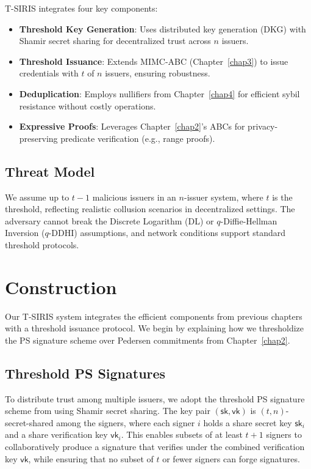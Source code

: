 T-SIRIS integrates four key components:
\begin{itemize}
    \item \textbf{Threshold Key Generation}: Uses distributed key generation (DKG) with Shamir secret sharing for decentralized trust across $n$ issuers.
    \item \textbf{Threshold Issuance}: Extends MIMC-ABC (Chapter~\ref{chap3}) to issue credentials with $t$ of $n$ issuers, ensuring robustness.
    \item \textbf{Deduplication}: Employs nullifiers from Chapter~\ref{chap4} for efficient sybil resistance without costly operations.
    \item \textbf{Expressive Proofs}: Leverages Chapter~\ref{chap2}'s ABCs for privacy-preserving predicate verification (e.g., range proofs).
\end{itemize}

\subsection{Threat Model}

We assume up to $t-1$ malicious issuers in an $n$-issuer system, where $t$ is the threshold, reflecting realistic collusion scenarios in decentralized settings. The adversary cannot break the Discrete Logarithm (DL) or $q$-Diffie-Hellman Inversion ($q$-DDHI) assumptions, and network conditions support standard threshold protocols.






\section{Construction}
\label{sec:threshold-construction}

Our T-SIRIS system integrates the efficient components from previous chapters with a threshold issuance protocol. We begin by explaining how we thresholdize the PS signature scheme over Pedersen commitments from Chapter~\ref{chap2}.

\subsection{Threshold PS Signatures}

To distribute trust among multiple issuers, we adopt the threshold PS signature scheme from \cite{tomescu2022utt} using Shamir secret sharing. The key pair $(\mathsf{sk}, \mathsf{vk})$ is $(t,n)$-secret-shared among the signers, where each signer $i$ holds a share secret key $\mathsf{sk}_i$ and a share verification key $\mathsf{vk}_i$. This enables subsets of at least $t+1$ signers to collaboratively produce a signature that verifies under the combined verification key $\mathsf{vk}$, while ensuring that no subset of $t$ or fewer signers can forge signatures.

